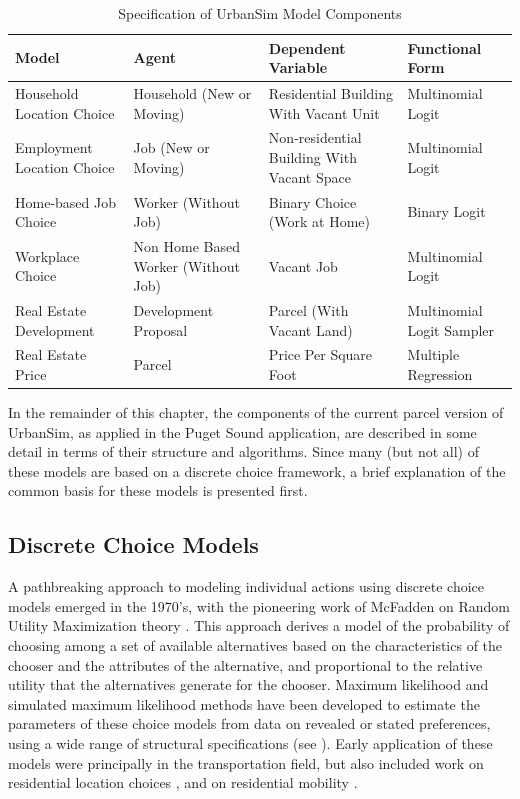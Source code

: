 \begin{table}[htp]
\caption{Specification of UrbanSim Model Components}
\label{tab:components-parcel}
\begin{tabular}{p{4.5cm} p{3.4cm}p{3.4cm}p{3.3cm}}
\toprule[1.5pt]
Model & Agent & Dependent Variable & Functional Form \\
\midrule
Household Location Choice & Household (New or Moving) & Residential Building With Vacant Unit & Multinomial Logit \\
\midrule
Employment Location Choice & Job (New or Moving) & Non-residential Building With Vacant Space & Multinomial Logit \\
\midrule
Home-based Job Choice & Worker (Without Job) & Binary Choice (Work at Home) & Binary Logit \\
\midrule
Workplace Choice & Non Home Based Worker (Without Job) & Vacant Job & Multinomial Logit \\
\midrule
Real Estate Development  & Development Proposal & Parcel (With Vacant Land) & Multinomial Logit Sampler \\
\midrule
Real Estate Price & Parcel & Price Per Square Foot & Multiple Regression \\
\bottomrule[1.5pt]
\end{tabular}
\end{table}


In the remainder of this chapter, the components of the current parcel version of UrbanSim,
as applied in the Puget Sound application, are described in some detail in terms of their
structure and algorithms.  Since many (but not all) of these models are based on a discrete choice framework,
a brief explanation of the common basis for these models is presented first.

\subsection{Discrete Choice Models}
\label{sec:discrete-choice}

A pathbreaking approach to modeling individual actions using discrete
choice models emerged in the 1970's, with the pioneering work of
McFadden on Random Utility Maximization theory
\cite{mcfadden-1974,mcfadden-1981}. This approach derives a model of
the probability of choosing among a set of available alternatives
based on the characteristics of the chooser and the attributes of
the alternative, and proportional to the relative utility that the
alternatives generate for the chooser. Maximum likelihood and
simulated maximum likelihood methods have been developed to estimate
the parameters of these choice models from data on revealed or
stated preferences, using a wide range of structural specifications
(see \cite{train-book-2003}). Early application of these models were
principally in the transportation field, but also included work on
residential location choices
\cite{quigley-eer-1976,lerman-trr-1977,mcfadden-1978}, and
on residential mobility \cite{clark-vanlierop-1986}.

